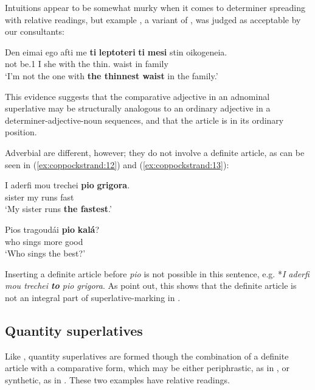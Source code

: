 \documentclass[output=paper
,modfonts
,nonflat]{langsci/langscibook}
\begin{document}
Intuitions appear to be somewhat murky when it comes to determiner spreading with relative readings, but example , a variant of , was judged as acceptable  by our consultants:

\ea \label{ex:coppockstrand:11}
\gll Den eimai ego afti me \textbf{ti} \textbf{leptoteri} \textbf{ti} \textbf{mesi}  stin oikogeneia.\\
 not be.1\sg{} I she with the thin.\cmpr{}   waist  in family\\
 \glt `I'm not the one with \textbf{the thinnest waist} in the family.'
\z

This evidence suggests that the comparative adjective in an adnominal superlative may be structurally analogous to an ordinary adjective in a determiner-adjective-noun sequences, and that the article is in its ordinary position.

Adverbial  are different, however; they do not involve a definite article, as can be seen in (\ref{ex:coppockstrand:12}) and (\ref{ex:coppockstrand:13}):

\ea{} \label{ex:coppockstrand:12}
\gll I aderfi mou trechei \textbf{pio} \textbf{grigora}.\\
 sister my runs \cmpr{} fast\\
\glt `My sister runs \textbf{the fastest}.'
\z
 
\ea{} \label{ex:coppockstrand:13}
\gll Pios tragoud\'ai \textbf{pio} \textbf{kal\'a}?\\
who sings more good\\
\glt `Who sings the best?' \citep[16, ex.\ 71]{Dobrovie-SorinGiurgea2015}\\
\z

Inserting a definite article before \textit{pio} is not possible in this sentence, e.g. *\textit{I aderfi mou trechei \textbf{to} pio grigora}. As \citet{Dobrovie-SorinGiurgea2015} point out, this shows that the definite article is not an integral part of superlative-marking in .

\subsection{Quantity superlatives}

Like , quantity superlatives are formed though the combination of a definite article with a comparative form, which may be either periphrastic, as in , or synthetic, as in . These two examples have relative readings.
\end{document}
